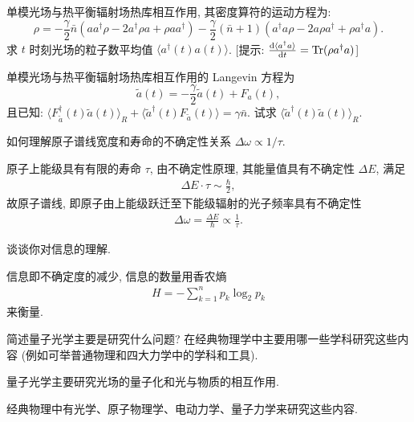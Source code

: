 \documentclass{assignment}
\begin{document}
\begin{prob}
    单模光场与热平衡辐射场热库相互作用, 其密度算符的运动方程为:
    \[
        \rho=-\frac{\gamma}{2}\bar{n}(aa^{\dagger}\rho-2a^{\dagger}\rho a+\rho aa^{\dagger})-\frac{\gamma}{2}(\bar{n}+1)(a^{\dagger}a\rho-2a\rho a^{\dagger}+\rho a^{\dagger}a).
    \]
    求 $t$ 时刻光场的粒子数平均值 $\langle a^{\dagger}(t)a(t)\rangle$. [提示: $\frac{\mathrm{d}\langle a^{\dagger}a\rangle}{\mathrm{d}t}=\operatorname{Tr}(\rho a^{\dagger}a)$]
\end{prob}
\begin{sol}
    
\end{sol}

\begin{prob}
    单模光场与热平衡辐射场热库相互作用的 Langevin 方程为
    \[
        \tilde{a}(t)=-\frac{\gamma}{2}\tilde{a}(t)+F_a(t),
    \]
    且已知: $\langle F_{\tilde{a}}^{\dagger}(t)\tilde{a}(t)\rangle_R+\langle\tilde{a}^{\dagger}(t)F_{\tilde{a}}(t)\rangle=\gamma\bar{n}$. 试求 $\langle\tilde{a}^{\dagger}(t)\tilde{a}(t)\rangle_R$.
\end{prob}
\begin{sol}
    
\end{sol}

\begin{prob}[附加题]
    如何理解原子谱线宽度和寿命的不确定性关系 $\Delta\omega\propto 1/\tau$.
\end{prob}
\begin{sol}
    原子上能级具有有限的寿命 $\tau$, 由不确定性原理, 其能量值具有不确定性 $\Delta E$, 满足
    \begin{align}
        \Delta E\cdot\tau\sim\frac{\hbar}{2},
    \end{align}
    故原子谱线, 即原子由上能级跃迁至下能级辐射的光子频率具有不确定性
    \begin{align}
        \Delta\omega=\frac{\Delta E}{\hbar}\propto\frac{1}{\tau}.
    \end{align}
\end{sol}

\begin{prob}[附加题]
    谈谈你对信息的理解.
\end{prob}
\begin{sol}
    信息即不确定度的减少, 信息的数量用香农熵
    \begin{align}
        H=-\sum_{k=1}^np_k\log_2p_k
    \end{align}
    来衡量.
\end{sol}

\begin{prob}[附加题]
    简述量子光学主要是研究什么问题? 在经典物理学中主要用哪一些学科研究这些内容 (例如可举普通物理和四大力学中的学科和工具).
\end{prob}
\begin{sol}
    量子光学主要研究光场的量子化和光与物质的相互作用.

    经典物理中有光学、原子物理学、电动力学、量子力学来研究这些内容.
\end{sol}
\end{document}
